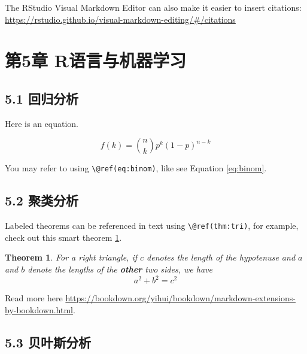 \documentclass[
]{book}
\newtheorem{theorem}{Theorem}[chapter]
\theoremstyle{definition}
\theoremstyle{definition}
\theoremstyle{definition}
\theoremstyle{definition}
\theoremstyle{remark}
\begin{document}
The RStudio Visual Markdown Editor can also make it easier to insert citations: \url{https://rstudio.github.io/visual-markdown-editing/\#/citations}

\hypertarget{ux7b2c5ux7ae0-rux8bedux8a00ux4e0eux673aux5668ux5b66ux4e60}{%
\chapter*{第5章 R语言与机器学习}\label{ux7b2c5ux7ae0-rux8bedux8a00ux4e0eux673aux5668ux5b66ux4e60}}

\hypertarget{ux56deux5f52ux5206ux6790-1}{%
\section*{5.1 回归分析}\label{ux56deux5f52ux5206ux6790-1}}

Here is an equation.

\begin{equation} 
  f\left(k\right) = \binom{n}{k} p^k\left(1-p\right)^{n-k}
  \label{eq:binom}
\end{equation}

You may refer to using \texttt{\textbackslash{}@ref(eq:binom)}, like see Equation \eqref{eq:binom}.

\hypertarget{ux805aux7c7bux5206ux6790}{%
\section*{5.2 聚类分析}\label{ux805aux7c7bux5206ux6790}}

Labeled theorems can be referenced in text using \texttt{\textbackslash{}@ref(thm:tri)}, for example, check out this smart theorem \ref{thm:tri}.

\begin{theorem}
\protect\hypertarget{thm:tri}{}\label{thm:tri}For a right triangle, if \(c\) denotes the \emph{length} of the hypotenuse
and \(a\) and \(b\) denote the lengths of the \textbf{other} two sides, we have
\[a^2 + b^2 = c^2\]
\end{theorem}

Read more here \url{https://bookdown.org/yihui/bookdown/markdown-extensions-by-bookdown.html}.

\hypertarget{ux8d1dux53f6ux65afux5206ux6790}{%
\section*{5.3 贝叶斯分析}\label{ux8d1dux53f6ux65afux5206ux6790}}
\end{document}
